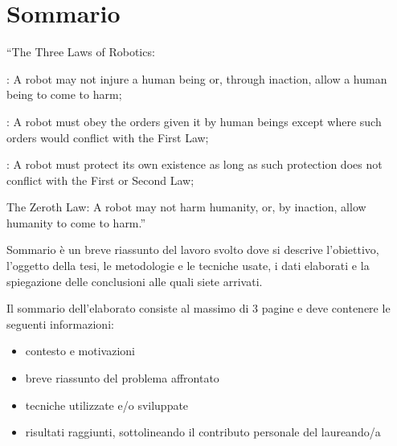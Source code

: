 \chapter*{Sommario} %
\label{sommario}


“The Three Laws of Robotics:

: A robot may not injure a human being or, through inaction, allow a human being to come to harm;

: A robot must obey the orders given it by human beings except where such orders would conflict with the First Law;

: A robot must protect its own existence as long as such protection does not conflict with the First or Second Law;

\noindent The Zeroth Law: A robot may not harm humanity, or, by inaction, allow humanity to come to harm.”


Sommario è un breve riassunto del lavoro svolto dove si descrive l'obiettivo, l'oggetto della tesi, le metodologie e le tecniche usate, i dati elaborati e la spiegazione delle conclusioni alle quali siete arrivati.  

Il sommario dell’elaborato consiste al massimo di 3 pagine e deve contenere le seguenti informazioni:
\begin{itemize}
  \item contesto e motivazioni 
  \item breve riassunto del problema affrontato
  \item tecniche utilizzate e/o sviluppate
  \item risultati raggiunti, sottolineando il contributo personale del laureando/a
\end{itemize}




